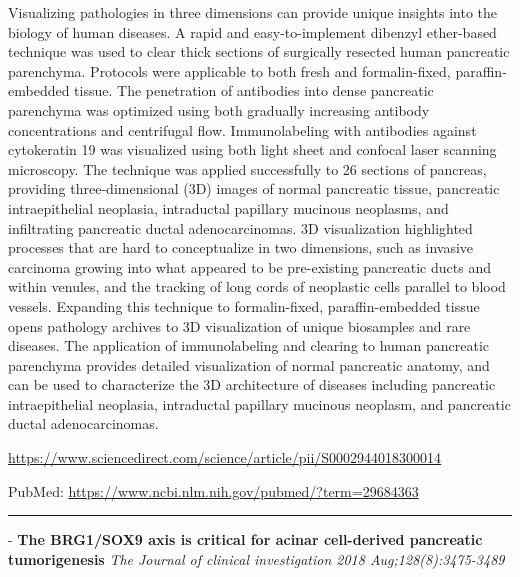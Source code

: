 \documentclass[]{article}
\begin{document}
Visualizing pathologies in three dimensions can provide unique insights
into the biology of human diseases. A rapid and easy-to-implement
dibenzyl ether-based technique was used to clear thick sections of
surgically resected human pancreatic parenchyma. Protocols were
applicable to both fresh and formalin-fixed, paraffin-embedded tissue.
The penetration of antibodies into dense pancreatic parenchyma was
optimized using both gradually increasing antibody concentrations and
centrifugal flow. Immunolabeling with antibodies against cytokeratin 19
was visualized using both light sheet and confocal laser scanning
microscopy. The technique was applied successfully to 26 sections of
pancreas, providing three-dimensional (3D) images of normal pancreatic
tissue, pancreatic intraepithelial neoplasia, intraductal papillary
mucinous neoplasms, and infiltrating pancreatic ductal adenocarcinomas.
3D visualization highlighted processes that are hard to conceptualize in
two dimensions, such as invasive carcinoma growing into what appeared to
be pre-existing pancreatic ducts and within venules, and the tracking of
long cords of neoplastic cells parallel to blood vessels. Expanding this
technique to formalin-fixed, paraffin-embedded tissue opens pathology
archives to 3D visualization of unique biosamples and rare diseases. The
application of immunolabeling and clearing to human pancreatic
parenchyma provides detailed visualization of normal pancreatic anatomy,
and can be used to characterize the 3D architecture of diseases
including pancreatic intraepithelial neoplasia, intraductal papillary
mucinous neoplasm, and pancreatic ductal adenocarcinomas.

\url{https://www.sciencedirect.com/science/article/pii/S0002944018300014}

PubMed: \url{https://www.ncbi.nlm.nih.gov/pubmed/?term=29684363}

{}

{}

\begin{center}\rule{0.5\linewidth}{\linethickness}\end{center}

 - \textbf{The BRG1/SOX9 axis is critical for acinar cell-derived
pancreatic tumorigenesis} \emph{The Journal of clinical investigation
2018 Aug;128(8):3475-3489}
\end{document}

